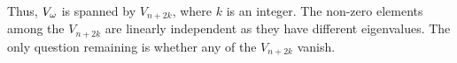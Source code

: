  Thus, $V_{\omega}$ is spanned by $V_{n+2k}$, where $k$ is an integer. The non-zero elements
 among the $V_{n+2k}$ are linearly independent as they have different eigenvalues. The
 only question remaining is whether any of the $V_{n+2k}$ vanish.

